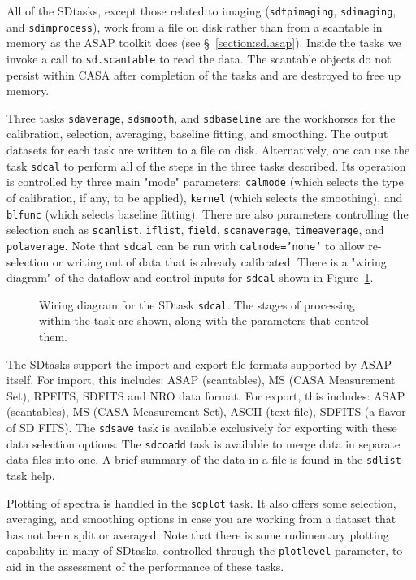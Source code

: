 All of the SDtasks, except  those related to imaging  ({\tt sdtpimaging}, {\tt sdimaging}, and {\tt sdimprocess}), 
work from a file on disk rather than from
a scantable in memory as the ASAP toolkit does (see 
\S~\ref{section:sd.asap}).  Inside the tasks we invoke a call
to {\tt sd.scantable} to read the data.  The scantable objects
do not persist within CASA after completion of the tasks and
are destroyed to free up memory. 

Three tasks {\tt sdaverage}, {\tt sdsmooth}, and {\tt sdbaseline} are the
workhorses for the calibration, selection,
averaging, baseline fitting, and smoothing. The output datasets for
each task are written to a file on disk.
Alternatively, one can use the task {\tt sdcal} to perform all of the steps in
the three tasks described. 
Its operation is
controlled by three main "mode" parameters: {\tt calmode} (which selects
the type of calibration, if any, to be applied), {\tt kernel} (which selects
the smoothing), and {\tt blfunc} (which selects baseline fitting).  There
are also parameters controlling the selection such as {\tt scanlist}, 
{\tt iflist}, {\tt field}, {\tt scanaverage}, {\tt timeaverage}, and
{\tt polaverage}.  Note that {\tt sdcal} can be
run with {\tt calmode='none'} to allow re-selection or writing out of data
that is already calibrated.  There is a "wiring diagram" of the dataflow and control inputs for
{\tt sdcal} shown in Figure~\ref{fig:sdcal}.

\begin{figure}[h!]
\begin{center}
\caption{\label{fig:sdcal} Wiring diagram for the SDtask {\tt sdcal}.
The stages of processing within the task are shown, along with the
parameters that control them. }
\hrulefill
\end{center}
\end{figure}

The SDtasks support the import and export file formats supported
by ASAP itself.  For import, this includes:  ASAP (scantables), 
MS (CASA Measurement Set), RPFITS, SDFITS and NRO data format.  
For export, this includes: ASAP (scantables), MS (CASA Measurement Set),
ASCII (text file), SDFITS (a flavor of SD FITS).
The {\tt sdsave} task is available exclusively for exporting with these
data selection options.  The {\tt sdcoadd} task is available to merge data in separate data files
into one.  A brief summary of the data in a file is found in the {\tt sdlist}
task help.

Plotting of spectra is handled in the {\tt sdplot} task.  It also offers
some selection, averaging, and smoothing options in case you are
working from a dataset that has not been split or averaged.  Note that
there is some rudimentary plotting capability in many of SDtasks, 
controlled through the {\tt plotlevel} parameter, 
to aid in the assessment of the performance of these tasks.

